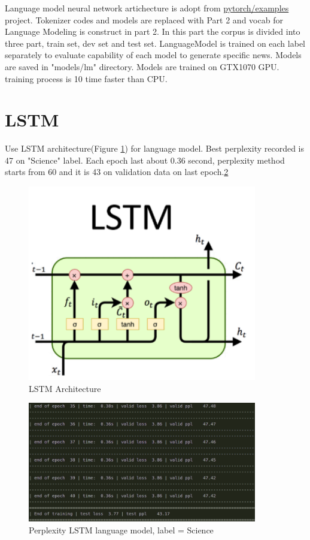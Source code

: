 \label{chapter:experiments}
 
Language model neural network artichecture is adopt from \href{https://github.com/pytorch/examples/tree/master/word_language_model}{pytorch/examples} project. Tokenizer codes and models are replaced with Part 2 and vocab for Language Modeling is construct in part 2. In this part the corpus is divided into three part, train set, dev set and test set. LanguageModel is trained on each label separately to evaluate capability of each model to generate specific news. Models are saved in "models/lm" directory. 
Models are trained on GTX1070 GPU. training process is 10 time faster than CPU. 
\section{LSTM}
Use LSTM architecture(Figure \ref{fig:mylstm}) for language model. Best perplexity recorded is 47 on "Science" label. Each epoch last about 0.36 second, perplexity method starts from 60 and it is 43 on validation data on last epoch.\ref{fig:lstm_education}

\begin{figure}
	\centering
	\includegraphics[width=10cm]{images/lstm.png}
	\caption{LSTM Architecture}
	\label{fig:mylstm}
	
\end{figure}

\begin{figure}
	\centering
	\includegraphics[width=10cm]{images/lstm_danesh.png}
	\caption{Perplexity LSTM language model, label = Science}
	\label{fig:lstm_education}
\end{figure}

